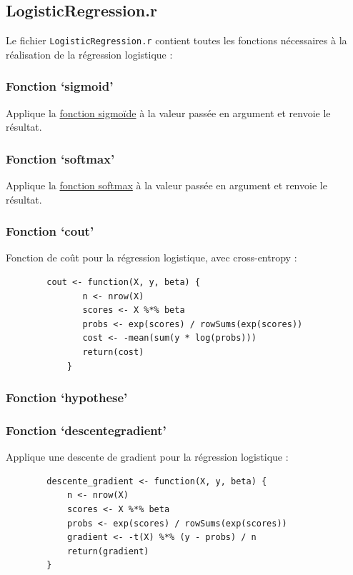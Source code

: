 \documentclass[10pt,french]{report}
\begin{document}
	\subsection{LogisticRegression.r}

	Le fichier \texttt{LogisticRegression.r} contient toutes les fonctions nécessaires à la réalisation de la régression logistique :

	\subsubsection{Fonction \enquote*{sigmoid}}
	Applique la \hyperref[fonction sigmoïde]{fonction sigmoïde} à la valeur passée en argument et renvoie le résultat.

	\subsubsection{Fonction \enquote*{softmax}}
	Applique la \hyperref[fonction softmax]{fonction softmax} à la valeur passée en argument et renvoie le résultat.

	\subsubsection{Fonction \enquote*{cout}}
	Fonction de coût pour la régression logistique, avec cross-entropy :

	\begin{verbatim}
		cout <- function(X, y, beta) {
			   n <- nrow(X)
			   scores <- X %*% beta
			   probs <- exp(scores) / rowSums(exp(scores))
			   cost <- -mean(sum(y * log(probs)))
			   return(cost)
		    }
	\end{verbatim}

	\subsubsection{Fonction \enquote*{hypothese}}

	\subsubsection{Fonction \enquote*{descente\textunderscore gradient}}

	Applique une descente de gradient pour la régression logistique :
	\begin{verbatim}
		descente_gradient <- function(X, y, beta) {
			n <- nrow(X)
			scores <- X %*% beta
			probs <- exp(scores) / rowSums(exp(scores))
			gradient <- -t(X) %*% (y - probs) / n
			return(gradient)
		}
	\end{verbatim}
\end{document}
